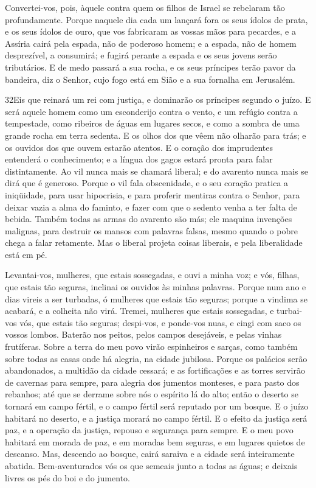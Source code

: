 Convertei-vos, pois, àquele contra quem os filhos de Israel se
rebelaram tão profundamente. Porque naquele dia cada um lançará
fora os seus ídolos de prata, e os seus ídolos de ouro, que vos
fabricaram as vossas mãos para pecardes, e a Assíria cairá pela
espada, não de poderoso homem; e a espada, não de homem desprezível,
a consumirá; e fugirá perante a espada e os seus jovens serão
tributários. E de medo passará a sua rocha, e os seus príncipes
terão pavor da bandeira, diz o Senhor, cujo fogo está em Sião e a
sua fornalha em Jerusalém.

\medskip

\lettrine{32}{}Eis que reinará um rei com justiça, e dominarão
os príncipes segundo o juízo. E será aquele homem como um
esconderijo contra o vento, e um refúgio contra a tempestade, como
ribeiros de águas em lugares secos, e como a sombra de uma grande
rocha em terra sedenta. E os olhos dos que vêem não olharão para
trás; e os ouvidos dos que ouvem estarão atentos. E o coração
dos imprudentes entenderá o conhecimento; e a língua dos gagos
estará pronta para falar distintamente. Ao vil nunca mais se
chamará liberal; e do avarento nunca mais se dirá que é generoso.
Porque o vil fala obscenidade, e o seu coração pratica a
iniqüidade, para usar hipocrisia, e para proferir mentiras contra o
Senhor, para deixar vazia a alma do faminto, e fazer com que o
sedento venha a ter falta de bebida. Também todas as armas do
avarento são más; ele maquina invenções malignas, para destruir os
mansos com palavras falsas, mesmo quando o pobre chega a falar
retamente. Mas o liberal projeta coisas liberais, e pela
liberalidade está em pé.

Levantai-vos, mulheres, que estais sossegadas, e ouvi a minha voz;
e vós, filhas, que estais tão seguras, inclinai os ouvidos às minhas
palavras. Porque num ano e dias vireis a ser turbadas, ó
mulheres que estais tão seguras; porque a vindima se acabará, e a
colheita não virá. Tremei, mulheres que estais sossegadas, e
turbai-vos vós, que estais tão seguras; despi-vos, e ponde-vos nuas,
e cingi com saco os vossos lombos. Baterão nos peitos, pelos
campos desejáveis, e pelas vinhas frutíferas. Sobre a terra
do meu povo virão espinheiros e sarças, como também sobre todas as
casas onde há alegria, na cidade jubilosa. Porque os palácios
serão abandonados, a multidão da cidade cessará; e as fortificações
e as torres servirão de cavernas para sempre, para alegria dos
jumentos monteses, e para pasto dos rebanhos; até que se
derrame sobre nós o espírito lá do alto; então o deserto se tornará
em campo fértil, e o campo fértil será reputado por um bosque.
E o juízo habitará no deserto, e a justiça morará no campo
fértil. E o efeito da justiça será paz, e a operação da
justiça, repouso e segurança para sempre. E o meu povo
habitará em morada de paz, e em moradas bem seguras, e em lugares
quietos de descanso. Mas, descendo ao bosque, cairá saraiva e
a cidade será inteiramente abatida. Bem-aventurados vós os
que semeais junto a todas as águas; e deixais livres os pés do boi e
do jumento.

